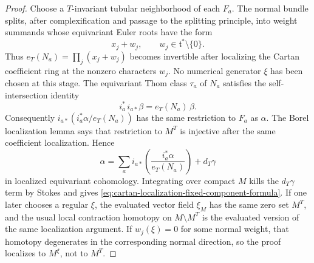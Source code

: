 \begin{proof}
Choose a \(T\)-invariant tubular neighborhood of each \(F_a\).  The normal
bundle splits, after complexification and passage to the splitting principle,
into weight summands whose equivariant Euler roots have the form
\[
  x_j+w_j,\qquad w_j\in\mathfrak t^*\setminus\{0\}.
\]
Thus \(e_T(N_a)=\prod_j(x_j+w_j)\) becomes invertible after localizing the
Cartan coefficient ring at the nonzero characters \(w_j\).  No numerical
generator \(\xi\) has been chosen at this stage.  The equivariant Thom class
\(\tau_a\) of \(N_a\) satisfies the self-intersection identity
\[
  i_a^*\,i_{a*}\beta=e_T(N_a)\,\beta .
\]
Consequently \(i_{a*}(i_a^*\alpha/e_T(N_a))\) has the same restriction to
\(F_a\) as \(\alpha\).  The Borel localization lemma says that restriction
to \(M^T\) is injective after the same coefficient localization.  Hence
\[
  \alpha
  =
  \sum_a i_{a*}\!\left(\frac{i_a^*\alpha}{e_T(N_a)}\right)
  +d_T\gamma
\]
in localized equivariant cohomology.  Integrating over compact \(M\) kills the
\(d_T\gamma\) term by Stokes and gives
\eqref{eq:cartan-localization-fixed-component-formula}.  If one later chooses
a regular \(\xi\), the evaluated vector field \(\xi_M\) has the same zero set
\(M^T\), and the usual local contraction homotopy on \(M\setminus M^T\) is the
evaluated version of the same localization argument.  If \(w_j(\xi)=0\) for
some normal weight, that homotopy degenerates in the corresponding normal
direction, so the proof localizes to \(M^\xi\), not to \(M^T\).
\end{proof}

